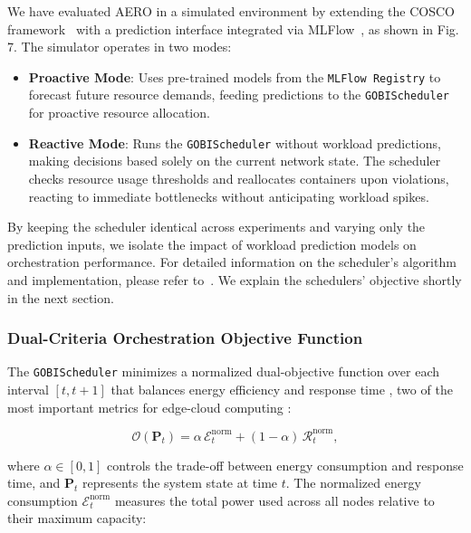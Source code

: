 \documentclass{ieeetmlcn}
\begin{document}
{\color{blue}
We have evaluated AERO in a simulated environment by extending the COSCO framework~\cite{tuli2021cosco} with a prediction interface integrated via MLFlow~\cite{MLFlow}, as shown in Fig. 7. The simulator operates in two modes:
\begin{itemize}
    \item \textbf{Proactive Mode}: Uses pre-trained models from the \texttt{MLFlow Registry} to forecast future resource demands, feeding predictions to the \texttt{GOBIScheduler} for proactive resource allocation.
    \item \textbf{Reactive Mode}: Runs the \texttt{GOBIScheduler} without workload predictions, making decisions based solely on the current network state. The scheduler checks resource usage thresholds and reallocates containers upon violations, reacting to immediate bottlenecks without anticipating workload spikes.
\end{itemize}

By keeping the scheduler identical across experiments and varying only the prediction inputs, we isolate the impact of workload prediction models on orchestration performance. For detailed information on the scheduler's algorithm and implementation, please refer to~\cite{tuli2021cosco}. We explain the schedulers' objective shortly in the next section.
}

\subsubsection{Dual-Criteria Orchestration Objective Function}

The \texttt{GOBIScheduler} minimizes a normalized dual-objective function over each interval $[t, t+1]$ that balances energy efficiency and response time \cite{tuli2021cosco}, two of the most important metrics for edge-cloud computing \cite{mcchesney2019defog}:

\begin{equation}
\label{eq:objective_function}
\mathcal{O}(\mathbf{P}_t) = \alpha \, \mathcal{E}_t^{\text{norm}} + (1-\alpha) \, \mathcal{R}_t^{\text{norm}},
\end{equation}

\noindent where $\alpha \in [0,1]$ controls the trade-off between energy consumption and response time, and $\mathbf{P}_t$ represents the system state at time $t$. The normalized energy consumption $\mathcal{E}_t^{\text{norm}}$ measures the total power used across all nodes relative to their maximum capacity:
\end{document}
